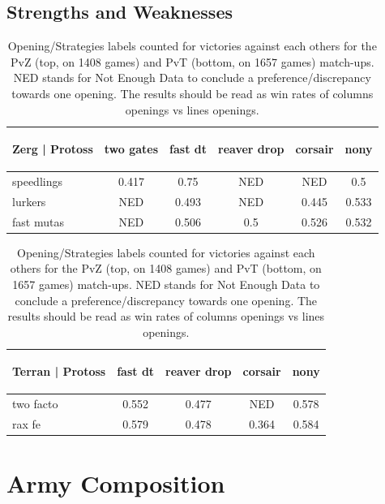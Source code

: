 


\subsection{Strengths and Weaknesses}

\begin{table}[ht] 
\begin{footnotesize}
\begin{center}
\begin{tabular}{|l|ccccc|}
\hline
\begin{tiny}Zerg | Protoss\end{tiny} & two gates & fast dt & reaver drop & corsair & nony\\
\hline
speedlings &  0.417& 0.75 & NED & NED & 0.5 \\
lurkers &  NED & 0.493& NED & 0.445 & 0.533\\
fast mutas &  NED & 0.506& 0.5 & 0.526& 0.532\\
\hline
\end{tabular}
\begin{tabular}{|l|cccc|}
\hline
\begin{tiny}Terran | Protoss\end{tiny} & fast dt & reaver drop & corsair & nony\\
\hline
two facto &  0.552& 0.477& NED & 0.578\\
rax fe &  0.579& 0.478& 0.364& 0.584\\
\hline
\end{tabular}
\caption{Opening/Strategies labels counted for victories against each others for the PvZ (top, on 1408 games) and PvT (bottom, on 1657 games) match-ups. NED stands for Not Enough Data to conclude a preference/discrepancy towards one opening. The results should be read as win rates of columns openings vs lines openings.}
\end{center}
\end{footnotesize}
\label{table:openingcontingency}
\end{table}


\section{Army Composition}
